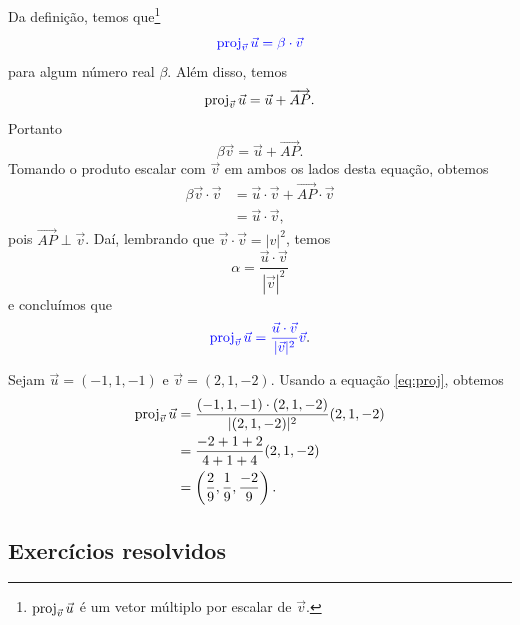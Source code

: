 Da definição, temos que\footnote{$\operatorname{proj}_{\vec{v}}\vec{u}$ é um vetor múltiplo por escalar de $\vec{v}$.}
\begin{equation}
  {\color{blue}\operatorname{proj}_{\vec{v}}\vec{u} = \beta\cdot \vec{v}}
\end{equation}
para algum número real $\beta$. Além disso, temos
\begin{equation}
  \operatorname{proj}_{\vec{v}}\vec{u} = \vec{u} + \overrightarrow{AP}.
\end{equation}
Portanto
\begin{equation}
  \beta\vec{v} = \vec{u} + \overrightarrow{AP}.
\end{equation}
Tomando o produto escalar com $\vec{v}$ em ambos os lados desta equação, obtemos
\begin{align}
  \beta\vec{v}\cdot\vec{v} &= \vec{u}\cdot\vec{v} + \overrightarrow{AP}\cdot\vec{v} \\
  &= \vec{u}\cdot\vec{v},
\end{align}
pois $\overrightarrow{AP}\perp\vec{v}$. Daí, lembrando que $\vec{v}\cdot\vec{v}=|v|^2$, temos
\begin{equation}
  \alpha = \frac{\vec{u}\cdot\vec{v}}{|\vec{v}|^2}
\end{equation}
e concluímos que
\begin{equation}\label{eq:proj}
  {\color{blue}\operatorname{proj}_{\vec{v}}\vec{u} = \frac{\vec{u}\cdot\vec{v}}{|\vec{v}|^2}\vec{v}}.
\end{equation}

\begin{ex}
  Sejam $\vec{u}=(-1,1,-1)$ e $\vec{v}=(2,1,-2)$. Usando a equação \eqref{eq:proj}, obtemos
  \begin{align}
    \operatorname{proj}_{\vec{v}}\vec{u} &= \frac{(-1,1,-1)\cdot(2,1,-2)}{|(2,1,-2)|^2}(2,1,-2)\\
                           &= \frac{-2+1+2}{4+1+4}(2,1,-2)\\
                           &= \left(\frac{2}{9},\frac{1}{9},\frac{-2}{9}\right).
  \end{align}
\end{ex}

\subsection*{Exercícios resolvidos}

